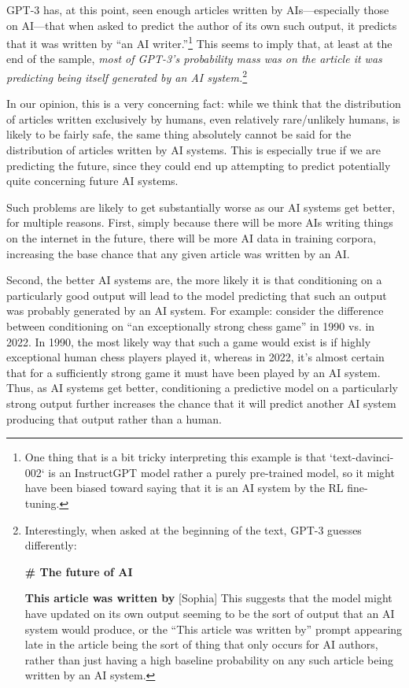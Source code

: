 \documentclass[
  onecolumn,
  natbib,
]{miri-tech-article}
\newenvironment{modelquote}%
  {\list{}{\leftmargin=0.3in\rightmargin=0.3in}\item[]}%
  {\endlist}
\begin{document}
GPT-3 has, at this point, seen enough articles written by AIs---especially those on AI---that when asked to predict the author of its own such output, it predicts that it was written by ``an AI writer.''\footnote{One thing that is a bit tricky interpreting this example is that `text-davinci-002` is an InstructGPT\cite{aligning_lms_follow_instructions} model rather a purely pre-trained model, so it might have been biased toward saying that it is an AI system by the RL fine-tuning.} This seems to imply that, at least at the end of the sample, \textit{most of GPT-3's probability mass was on the article it was predicting being itself generated by an AI system.}\footnote{Interestingly, when asked at the beginning of the text, GPT-3 guesses differently:
\begin{modelquote}
\textbf{\# The future of AI}

\textbf{This article was written by} [Sophia]
\end{modelquote}
This suggests that the model might have updated on its own output seeming to be the sort of output that an AI system would produce, or the ``This article was written by'' prompt appearing late in the article being the sort of thing that only occurs for AI authors, rather than just having a high baseline probability on any such article being written by an AI system.}

In our opinion, this is a very concerning fact: while we think that the distribution of articles written exclusively by humans, even relatively rare/unlikely humans, is likely to be fairly safe, the same thing absolutely cannot be said for the distribution of articles written by AI systems. This is especially true if we are predicting the future, since they could end up attempting to predict potentially quite concerning future AI systems.

Such problems are likely to get substantially worse as our AI systems get better, for multiple reasons. First, simply because there will be more AIs writing things on the internet in the future, there will be more AI data in training corpora, increasing the base chance that any given article was written by an AI.

Second, the better AI systems are, the more likely it is that conditioning on a particularly good output will lead to the model predicting that such an output was probably generated by an AI system. For example: consider the difference between conditioning on ``an exceptionally strong chess game'' in 1990 vs. in 2022. In 1990, the most likely way that such a game would exist is if highly exceptional human chess players played it, whereas in 2022, it's almost certain that for a sufficiently strong game it must have been played by an AI system. Thus, as AI systems get better, conditioning a predictive model on a particularly strong output further increases the chance that it will predict another AI system producing that output rather than a human.
\end{document}
